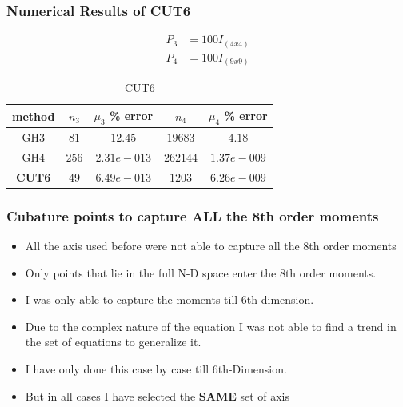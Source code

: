 \documentclass{beamer}
\begin{document}
\begin{frame}
\frametitle{Numerical Results of CUT6}
\begin{align*}
P_3&=100I_{(4x4)}\\
P_4&=100I_{(9x9)}
\end{align*}

\begin{table}
\caption{CUT6}
\normalsize
\begin{center}
\begin{tabular}{|c||c|c||c|c|}
\hline
method     & 		$n_3$ 	 	 	&				$\mu_3$ \% error 		& 		$n_4$     & 	$\mu_4$ \% error						\\
\hline
GH3   	 &  	 	$81$ 			 	&	  		$	12.45$ 				 	    &   $19683$          &     $4.18$									 \\
\hline 
GH4   	 &  	 	$256$ 			 	&	  		$2.31e-013$ 				&     $262144$        &     $1.37e-009$									 \\
\hline
{\bf CUT6 	}		 &	  	$49$  				&  		$6.49e-013$ 				  &       $1203$      & 	$6.26e-009$									\\
\hline
\end{tabular}
\end{center}
\end{table}

\end{frame}
\begin{frame}
\frametitle{Cubature points to capture ALL the 8th order moments}
\begin{itemize}[<+->]
\item All the axis used before were not able to capture all the 8th order moments
\item Only points that lie in the full N-D space enter the 8th order moments.
\item I was only able to capture the moments till 6th dimension.
\item Due to the complex nature of the equation I was not able to find a trend in the set of equations to generalize it.
\item I have only done this  case by case till 6th-Dimension. 
\item But in all cases I have selected the {\bf SAME} set of axis
\end{itemize}
\end{frame}
\end{document}
